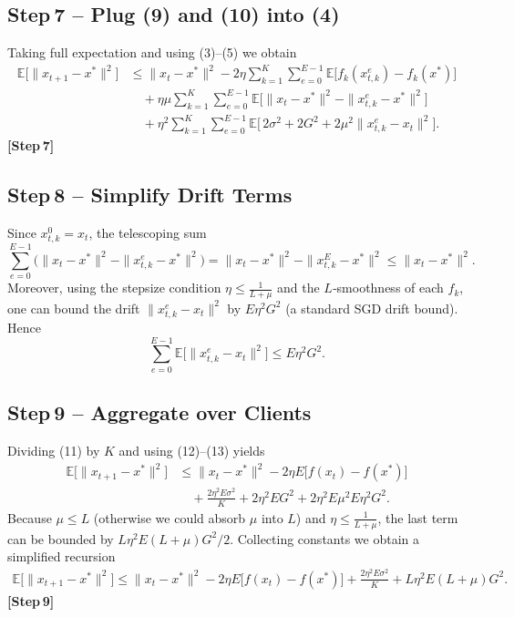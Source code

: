 \documentclass[11pt]{article}
\newcommand{\E}{\mathbb{E}}
\begin{document}
\subsection*{Step 7 – Plug (9) and (10) into (4)}
Taking full expectation and using (3)–(5) we obtain
\begin{align}
\E\!\bigl[\|x_{t+1}-x^{\ast}\|^{2}\bigr]
&\le \|x_{t}-x^{\ast}\|^{2}
   -2\eta\sum_{k=1}^{K}\sum_{e=0}^{E-1}
      \E\!\bigl[f_k(x_{t,k}^{e})-f_k(x^{\ast})\bigr] \nonumber\\
&\quad
   +\eta\mu\sum_{k=1}^{K}\sum_{e=0}^{E-1}
      \E\!\bigl[\|x_t-x^{\ast}\|^{2}-\|x_{t,k}^{e}-x^{\ast}\|^{2}\bigr] \nonumber\\
&\quad
   +\eta^{2}\sum_{k=1}^{K}\sum_{e=0}^{E-1}
      \E\!\bigl[\,2\sigma^{2}+2G^{2}+2\mu^{2}\|x_{t,k}^{e}-x_t\|^{2}\bigr]. \tag{11}
\end{align}
\textbf{[Step 7]}

\subsection*{Step 8 – Simplify Drift Terms}
Since $x_{t,k}^{0}=x_t$, the telescoping sum
\[
\sum_{e=0}^{E-1}\bigl(\|x_t-x^{\ast}\|^{2}-\|x_{t,k}^{e}-x^{\ast}\|^{2}\bigr)
= \|x_t-x^{\ast}\|^{2}-\|x_{t,k}^{E}-x^{\ast}\|^{2}
\le \|x_t-x^{\ast}\|^{2}.
\tag{12}
\]
Moreover, using the stepsize condition $\eta\le\frac{1}{L+\mu}$ and the
$L$‑smoothness of each $f_k$, one can bound the drift $\|x_{t,k}^{e}-x_t\|^{2}$
by $E\eta^{2}G^{2}$ (a standard SGD drift bound). Hence
\[
\sum_{e=0}^{E-1}\E\!\bigl[\|x_{t,k}^{e}-x_t\|^{2}\bigr]
\le E\eta^{2}G^{2}. \tag{13}
\]

\subsection*{Step 9 – Aggregate over Clients}
Dividing (11) by $K$ and using (12)–(13) yields
\begin{align}
\E\!\bigl[\|x_{t+1}-x^{\ast}\|^{2}\bigr]
&\le \|x_{t}-x^{\ast}\|^{2}
   -2\eta E\bigl[f(x_t)-f(x^{\ast})\bigr]   \nonumber\\
&\quad
   +\frac{2\eta^{2}E\sigma^{2}}{K}
   +2\eta^{2}E G^{2}
   +2\eta^{2}E\mu^{2}E\eta^{2}G^{2}. \tag{14}
\end{align}
Because $\mu\le L$ (otherwise we could absorb $\mu$ into $L$) and $\eta\le
\frac{1}{L+\mu}$, the last term can be bounded by $L\eta^{2}E(L+\mu)G^{2}/2$.
Collecting constants we obtain a simplified recursion
\begin{align}
\E\!\bigl[\|x_{t+1}-x^{\ast}\|^{2}\bigr]
\le \|x_{t}-x^{\ast}\|^{2}
   -2\eta E\bigl[f(x_t)-f(x^{\ast})\bigr]
   +\frac{2\eta^{2}E\sigma^{2}}{K}
   +L\eta^{2}E(L+\mu)G^{2}. \tag{15}
\end{align}
\textbf{[Step 9]}
\end{document}
